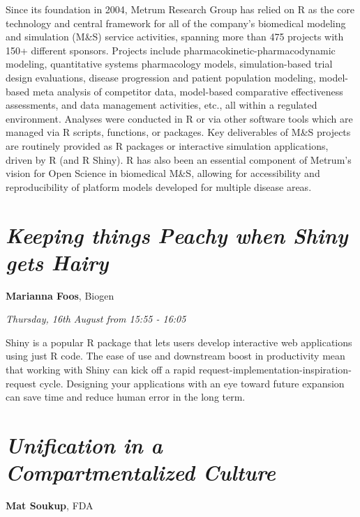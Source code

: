 \documentclass[]{book}
\theoremstyle{definition}
\theoremstyle{definition}
\theoremstyle{definition}
\theoremstyle{remark}
\begin{document}
Since its foundation in 2004, Metrum Research Group has relied on R as
the core technology and central framework for all of the company's
biomedical modeling and simulation (M\&S) service activities, spanning
more than 475 projects with 150+ different sponsors. Projects include
pharmacokinetic-pharmacodynamic modeling, quantitative systems
pharmacology models, simulation-based trial design evaluations, disease
progression and patient population modeling, model-based meta analysis
of competitor data, model-based comparative effectiveness assessments,
and data management activities, etc., all within a regulated
environment. Analyses were conducted in R or via other software tools
which are managed via R scripts, functions, or packages. Key
deliverables of M\&S projects are routinely provided as R packages or
interactive simulation applications, driven by R (and R Shiny). R has
also been an essential component of Metrum's vision for Open Science in
biomedical M\&S, allowing for accessibility and reproducibility of
platform models developed for multiple disease areas.

\hypertarget{keeping-things-peachy-when-shiny-gets-hairy}{%
\section{\texorpdfstring{\emph{Keeping things Peachy when Shiny gets
Hairy}}{Keeping things Peachy when Shiny gets Hairy}}\label{keeping-things-peachy-when-shiny-gets-hairy}}

\textbf{Marianna Foos}, Biogen

\emph{Thursday, 16th August from 15:55 - 16:05}

Shiny is a popular R package that lets users develop interactive web
applications using just R code. The ease of use and downstream boost in
productivity mean that working with Shiny can kick off a rapid
request-implementation-inspiration-request cycle. Designing your
applications with an eye toward future expansion can save time and
reduce human error in the long term.

\hypertarget{unification-in-a-compartmentalized-culture}{%
\section{\texorpdfstring{\emph{Unification in a Compartmentalized
Culture}}{Unification in a Compartmentalized Culture}}\label{unification-in-a-compartmentalized-culture}}

\textbf{Mat Soukup}, FDA
\end{document}
